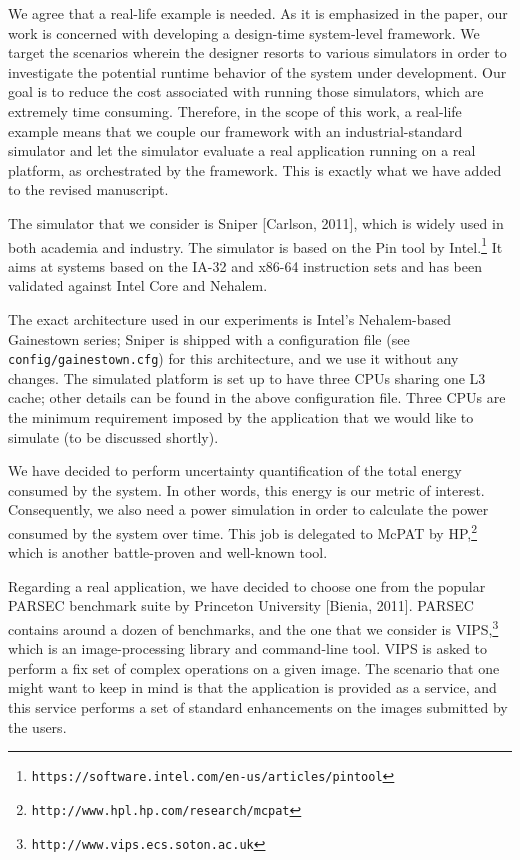 \begin{authors}
We agree that a real-life example is needed. As it is emphasized in the paper,
our work is concerned with developing a design-time system-level framework. We
target the scenarios wherein the designer resorts to various simulators in order
to investigate the potential runtime behavior of the system under development.
Our goal is to reduce the cost associated with running those simulators, which
are extremely time consuming. Therefore, in the scope of this work, a real-life
example means that we couple our framework with an industrial-standard simulator
and let the simulator evaluate a real application running on a real platform, as
orchestrated by the framework. This is exactly what we have added to the revised
manuscript.

The simulator that we consider is Sniper [Carlson, 2011], which is widely used
in both academia and industry. The simulator is based on the Pin tool by
Intel.\footnote{\texttt{https://software.intel.com/en-us/articles/pintool}} It
aims at systems based on the IA-32 and x86-64 instruction sets and has been
validated against Intel Core and Nehalem.

The exact architecture used in our experiments is Intel's Nehalem-based
Gainestown series; Sniper is shipped with a configuration file (see
\texttt{config/gainestown.cfg}) for this architecture, and we use it without any
changes. The simulated platform is set up to have three CPUs sharing one L3
cache; other details can be found in the above configuration file. Three CPUs
are the minimum requirement imposed by the application that we would like to
simulate (to be discussed shortly).

We have decided to perform uncertainty quantification of the total energy
consumed by the system. In other words, this energy is our metric of interest.
Consequently, we also need a power simulation in order to calculate the power
consumed by the system over time. This job is delegated to McPAT by
HP,\footnote{\texttt{http://www.hpl.hp.com/research/mcpat}} which is another
battle-proven and well-known tool.

Regarding a real application, we have decided to choose one from the popular
PARSEC benchmark suite by Princeton University [Bienia, 2011]. PARSEC contains
around a dozen of benchmarks, and the one that we consider is
VIPS,\footnote{\texttt{http://www.vips.ecs.soton.ac.uk}} which is an
image-processing library and command-line tool. VIPS is asked to perform a fix
set of complex operations on a given image. The scenario that one might want to
keep in mind is that the application is provided as a service, and this service
performs a set of standard enhancements on the images submitted by the users.


\end{authors}
